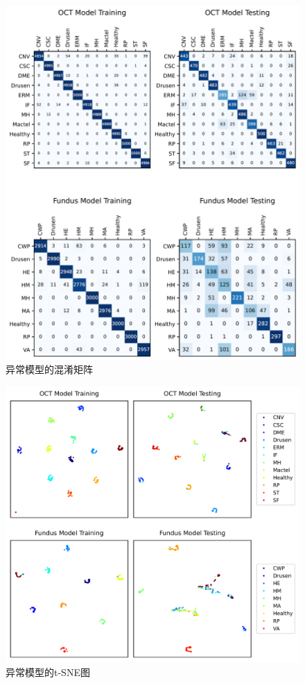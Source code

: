 \documentclass{article}
\begin{document}
		\begin{figure}[htbp]
			\centering
			\includegraphics[width=\linewidth]{Figs/abnormity_confusion_matrix.png}
			\caption{异常模型的混淆矩阵}
			\vspace{0.3cm}
			\label{fig:A_conf_mat}
		\end{figure}
		
		\begin{figure}[htbp]
			\centering
			\includegraphics[width=\linewidth]{Figs/abnormity_tSNE.png}
			\caption{异常模型的t-SNE图}
			\vspace{0.3cm}
			\label{fig:A_tSNE}
		\end{figure}
		
\end{document}
